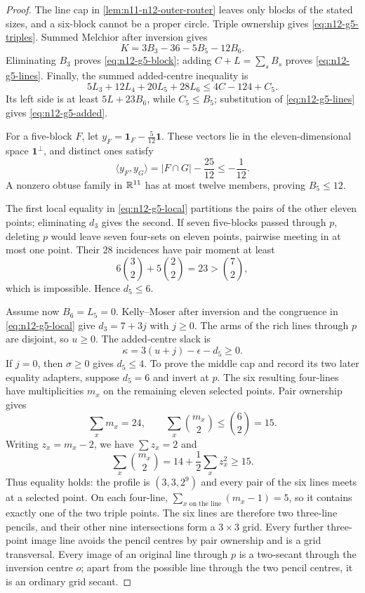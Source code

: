 \begin{proof}
The line cap in \cref{lem:n11-n12-outer-router} leaves only blocks of the
stated sizes, and a six-block cannot be a proper circle.  Triple ownership
gives \eqref{eq:n12-g5-triples}.  Summed Melchior after inversion gives
\[
 K=3B_3-36-5B_5-12B_6.
\]
Eliminating $B_3$ proves \eqref{eq:n12-g5-block}; adding
$C+L=\sum_sB_s$ proves \eqref{eq:n12-g5-lines}.  Finally, the summed
added-centre inequality is
\[
 5L_3+12L_4+20L_5+28L_6\le4C-124+C_5.
\]
Its left side is at least $5L+23B_6$, while $C_5\le B_5$; substitution of
\eqref{eq:n12-g5-lines} gives \eqref{eq:n12-g5-added}.

For a five-block $F$, let
$y_F=\mathbf1_F-\frac5{12}\mathbf1$.  These vectors lie in the
eleven-dimensional space $\mathbf1^\perp$, and distinct ones satisfy
\[
 \langle y_F,y_G\rangle=|F\cap G|-\frac{25}{12}\le-\frac1{12}.
\]
A nonzero obtuse family in $\mathbb{R}^{11}$ has at most twelve members, proving
$B_5\le12$.

The first local equality in \eqref{eq:n12-g5-local} partitions the pairs
of the other eleven points; eliminating $d_3$ gives the second.  If seven
five-blocks passed through $p$, deleting $p$ would leave seven four-sets
on eleven points, pairwise meeting in at most one point.  Their $28$
incidences have pair moment at least
\[
 6\binom32+5\binom22=23>\binom72,
\]
which is impossible.  Hence $d_5\le6$.

Assume now $B_6=L_5=0$.  Kelly--Moser after inversion and the congruence
in \eqref{eq:n12-g5-local} give $d_3=7+3j$ with $j\ge0$.  The arms of the
rich lines through $p$ are disjoint, so $u\ge0$.  The added-centre slack is
\begin{equation}\label{eq:n12-kappa-q}
 \kappa=3(u+j)-\epsilon-d_5\ge0.
\end{equation}
If $j=0$, then $\sigma\ge0$ gives $d_5\le4$.  To prove the middle cap and
record its two later equality adapters, suppose $d_5=6$ and invert at $p$.
The six resulting four-lines have multiplicities $m_x$ on the remaining
eleven selected points.  Pair ownership gives
\[
 \sum_xm_x=24,\qquad \sum_x\binom{m_x}{2}\le\binom62=15.
\]
Writing $z_x=m_x-2$, we have $\sum z_x=2$ and
\[
 \sum_x\binom{m_x}{2}=14+\frac12\sum_xz_x^2\ge15.
\]
Thus equality holds: the profile is $(3,3,2^9)$ and every pair of the six
lines meets at a selected point.  On each four-line,
$\sum_{x\text{ on the line}}(m_x-1)=5$, so it contains exactly one of the
two triple points.  The six lines are therefore two three-line pencils,
and their other nine intersections form a $3\times3$ grid.  Every further
three-point image line avoids the pencil centres by pair ownership and is
a grid transversal.  Every image of an original line through $p$ is a
two-secant through the inversion centre $o$; apart from the possible line
through the two pencil centres, it is an ordinary grid secant.


\end{proof}
